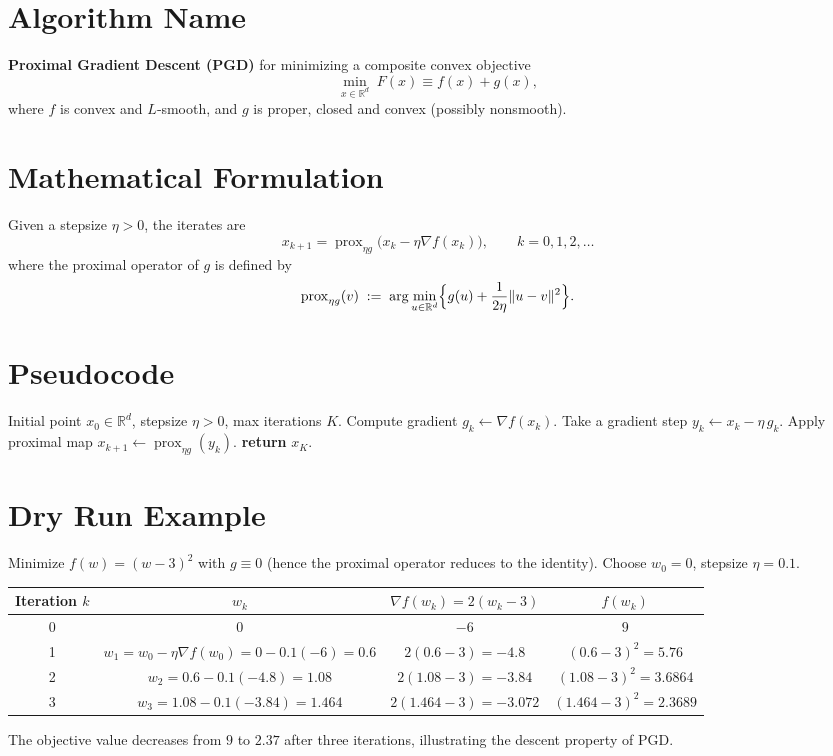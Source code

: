 \documentclass{article}
\begin{document}
\section*{Algorithm Name}
\textbf{Proximal Gradient Descent (PGD)} for minimizing a composite convex objective
\[
\min_{x\in\mathbb{R}^d}\;F(x)\equiv f(x)+g(x),
\]
where $f$ is convex and $L$‑smooth, and $g$ is proper, closed and convex (possibly nonsmooth).

\section*{Mathematical Formulation}
Given a stepsize $\eta>0$, the iterates are
\begin{equation}
\boxed{
x_{k+1}= \operatorname{prox}_{\eta g}\bigl(x_k-\eta \nabla f(x_k)\bigr)},
\qquad k=0,1,2,\dots
\end{equation}
where the proximal operator of $g$ is defined by
\[
\operatorname{prox}_{\eta g}(v)\;:=\;\arg\min_{u\in\mathbb{R}^d}
\Bigl\{ g(u)+\frac{1}{2\eta}\|u-v\|^2\Bigr\}.
\]

\section*{Pseudocode}
\begin{algorithm}[H]
\caption{Proximal Gradient Descent}
\begin{algorithmic}[1]
\Require Initial point $x_0\in\mathbb{R}^d$, stepsize $\eta>0$, max iterations $K$.
    \State Compute gradient $g_k \gets \nabla f(x_k)$.
    \State Take a gradient step $y_k \gets x_k - \eta\,g_k$.
    \State Apply proximal map $x_{k+1} \gets \operatorname{prox}_{\eta g}(y_k)$.
\EndFor
\State \textbf{return} $x_K$.
\end{algorithmic}
\end{algorithm}

\section*{Dry Run Example}
Minimize $f(w)=(w-3)^2$ with $g\equiv0$ (hence the proximal operator reduces to the identity).  
Choose $w_0=0$, stepsize $\eta=0.1$.

\begin{center}
\begin{tabular}{c|c|c|c}
Iteration $k$ & $w_k$ & $\nabla f(w_k)=2(w_k-3)$ & $f(w_k)$\\ \hline
0 & $0$ & $-6$ & $9$\\
1 & $w_1 = w_0-\eta\nabla f(w_0)=0-0.1(-6)=0.6$ & $2(0.6-3)=-4.8$ & $(0.6-3)^2=5.76$\\
2 & $w_2 = 0.6-0.1(-4.8)=1.08$ & $2(1.08-3)=-3.84$ & $(1.08-3)^2=3.6864$\\
3 & $w_3 = 1.08-0.1(-3.84)=1.464$ & $2(1.464-3)=-3.072$ & $(1.464-3)^2=2.3689$
\end{tabular}
\end{center}
The objective value decreases from $9$ to $2.37$ after three iterations, illustrating the descent property of PGD.
\end{document}
